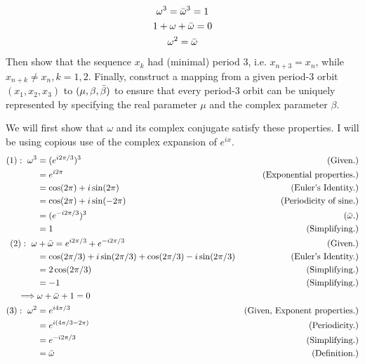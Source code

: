 \begin{gather}
    \omega^3 = \Bar{\omega}^3 = 1\\
    1 + \omega + \Bar{\omega} = 0\\
    \omega^2 = \Bar{\omega}
\end{gather}
Then show that the sequence $x_k$ had (minimal) period 3, i.e. $x_{n+3} = x_n$, while $x_{n + k} \neq x_n, k = 1, 2$. Finally, construct a mapping from a given period-3 orbit $(x_1, x_2, x_3)$ to $(\mu, \beta, \Bar{\beta})$ to ensure that every period-3 orbit can be uniquely represented by specifying the real parameter $\mu$ and the complex parameter $\beta$.
\partbreak
\begin{solution}

    We will first show that $\omega$ and its complex conjugate satisfy these properties. I will be using copious use of the complex expansion of $e^{ix}.$
    \alignbreak
    \begin{align*}
        (1): \ \omega^3 &= (e^{i2\pi / 3})^3 &\text{(Given.)}\\ 
        &= e^{i2\pi} &\text{(Exponential properties.)}\\
        &= \cos (2\pi) + i\sin (2\pi) &\text{(Euler's Identity.)}\\
        &= \cos (2\pi) + i\sin (-2\pi) &\text{(Periodicity of sine.)}\\
        &= (e^{-i2\pi / 3})^3 &(\Bar{\omega}.)\\
        &= 1 &\text{(Simplifying.)}\\
        (2): \ \omega& + \Bar{\omega} = e^{i2\pi / 3} + e^{-i2\pi / 3} &\text{(Given.)}\\
        &= \cos(2\pi/3) + i\sin(2\pi/3) + \cos(2\pi/3) - i\sin(2\pi / 3) &\text{(Euler's Identity.)}\\
        &= 2\cos(2\pi / 3) &\text{(Simplifying.)}\\
        &= -1 &\text{(Simplifying.)}\\
        \implies &\omega + \Bar{\omega} + 1 = 0\\
        (3) : \ \omega^2 &= e^{i4\pi / 3} &\text{(Given, Exponent properties.)}\\
        &= e^{i(4\pi / 3 - 2\pi)} &\text{(Periodicity.)}\\
        &= e^{-i2\pi / 3} &\text{(Simplifying.)}\\
        &= \Bar{\omega} &\text{(Definition.)}
    \end{align*}
    \vspace{-15mm}
\alignbreak


\end{solution}
